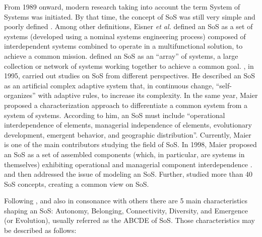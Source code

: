 From 1989 onward, modern research taking into account the term System of Systems was initiated. By that time, the concept of SoS was still very simple and poorly defined \citep{gorod2008system}. Among other definitions, Eisner \emph{et al.} \citep{eisner1991computer, eisner1993rcasse} defined an SoS as a set of systems (developed using a nominal systems engineering process) composed of interdependent systems combined to operate in a multifunctional solution, to achieve a common mission. \citet{shenhar1994new} defined an SoS as an ``array'' of systems, a large collection or network of systems working together to achieve a common goal. \citet{holland1995hidden}, in 1995, carried out studies on SoS from different perspectives. He described an SoS as an artificial complex adaptive system that, in continuous change, ``self-organizes'' with adaptive rules, to increase its complexity.
 In the same year, Maier proposed a characterization approach to differentiate a common system from a system of systems. According to him, an SoS must include ``operational interdependence of elements, managerial independence of elements, evolutionary development, emergent behavior, and geographic distribution''. Currently, Maier is one of the main contributors studying the field of SoS. In 1998, Maier proposed an SoS as a set of assembled components (which, in particular, are systems in themselves) exhibiting operational and managerial component interdependence \citep{maier1996architecting, maeir1998architecting}. \citet{kotov1997systems} and \citet{lukasik1998systems} then  addressed the issue of modeling an SoS. Further, \citet{boardman2006system} studied more than 40 SoS concepts, creating a common view on SoS. 

Following \citet{boardman2006system}, and also in consonance with others \citep{jamshidi2011system, gorod2014case, gorod2008system,dimario2006system,saunders2005system} there are 5 main characteristics shaping an SoS: Autonomy, Belonging, Connectivity, Diversity, and Emergence (or Evolution), usually referred as the ABCDE of SoS. Those characteristics may be described as follows:

